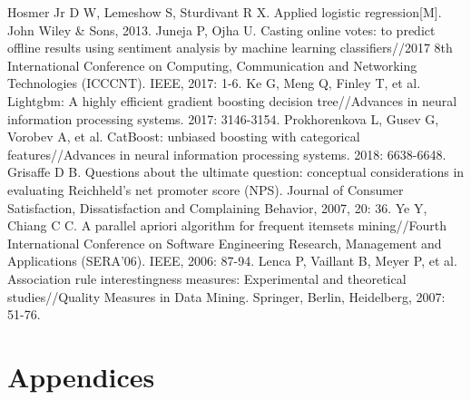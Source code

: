 \documentclass[12pt]{article}%
\begin{document}
\begin{thebibliography}{9}
	Hosmer Jr D W, Lemeshow S, Sturdivant R X. Applied logistic regression[M]. John Wiley \& Sons, 2013.
	Juneja P, Ojha U. Casting online votes: to predict offline results using sentiment analysis by machine learning classifiers//2017 8th International Conference on Computing, Communication and Networking Technologies (ICCCNT). IEEE, 2017: 1-6.
	Ke G, Meng Q, Finley T, et al. Lightgbm: A highly efficient gradient boosting decision tree//Advances in neural information processing systems. 2017: 3146-3154.
	Prokhorenkova L, Gusev G, Vorobev A, et al. CatBoost: unbiased boosting with categorical features//Advances in neural information processing systems. 2018: 6638-6648.
	Grisaffe D B. Questions about the ultimate question: conceptual considerations in evaluating Reichheld's net promoter score (NPS). Journal of Consumer Satisfaction, Dissatisfaction and Complaining Behavior, 2007, 20: 36.
	Ye Y, Chiang C C. A parallel apriori algorithm for frequent itemsets mining//Fourth International Conference on Software Engineering Research, Management and Applications (SERA'06). IEEE, 2006: 87-94.
	Lenca P, Vaillant B, Meyer P, et al. Association rule interestingness measures: Experimental and theoretical studies//Quality Measures in Data Mining. Springer, Berlin, Heidelberg, 2007: 51-76.
	
\end{thebibliography}


\newpage
\appendix
\section*{Appendices}\label{Appendices}
\end{document}

